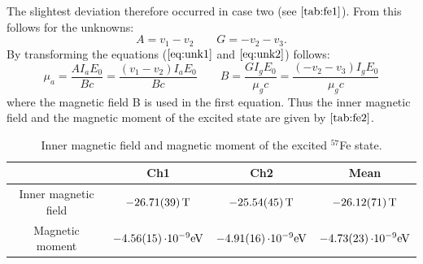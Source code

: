 The slightest deviation therefore occurred in case two (see $\autoref{tab:fe1}$). From this follows for the unknowns:
\begin{equation}
    A = v_1-v_2 \qquad G = -v_2-v_3.
\label{eq:unk2}
\end{equation}
By transforming the equations ($\autoref{eq:unk1}$ and $\autoref{eq:unk2}$) follows:
\begin{equation}
    \mu_a =\frac{AI_aE_0}{Bc} = \frac{(v_1-v_2)I_aE_0}{Bc} \qquad B= \frac{GI_gE_0}{\mu_gc}=\frac{(-v_2-v_3)I_gE_0}{\mu_gc}
\end{equation}
where the magnetic field B is used in the first equation. Thus the inner magnetic field and the magnetic moment of the excited state are given by $\autoref{tab:fe2}$.
\\

\begin{table}
    \centering
    \caption{Inner magnetic field and magnetic moment of the excited $^{57}$Fe state.}

    \begin{tabular}{c c c c}
     \toprule
     &Ch1&Ch2&Mean \\
     \hline
     Inner magnetic field &  $-\SI{26.71\pm 0.39}{T}$ &$-\SI{25.54\pm 0.45}{T}$   &$-\SI{26.12\pm 0.71}{T}$ \\
     Magnetic moment& $-\SI{4.56\pm 0.15}{\cdot 10^{-9}eV}$  &$-\SI{4.91\pm 0.16}{\cdot 10^{-9}eV}$   &$-\SI{4.73\pm 0.23}{\cdot 10^{-9}eV}$\\
     \bottomrule
    \end{tabular}

    \label{tab:fe2}
\end{table}
